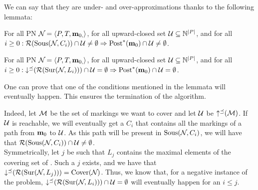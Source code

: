 We can say that they are under- and over-approximations thanks to the following lemmata:
\begin{lemm}
  For all \ac{PN} $\mathcal{N}_{} = \left\langle P_{}, T_{}, \mathbf{m}_{0,}\right\rangle$, for all upward-closed set $\mathcal{U} \subseteq \mathbb{N}^{\left|P\right|}$, and for all $i \geq 0: \operatorname{\mathcal{R}}(\operatorname{Sous}(\mathcal{N}_{},C_i)) \cap \mathcal{U} \neq \emptyset \Rightarrow \operatorname{Post}^*_{}(\mathbf{m}_0) \cap \mathcal{U} \neq \emptyset$.
\end{lemm}
\begin{lemm}
  For all \ac{PN} $\mathcal{N}_{} = \left\langle P_{}, T_{}, \mathbf{m}_{0,}\right\rangle$, for all upward-closed set $\mathcal{U} \subseteq \mathbb{N}^{\left|P\right|}$, and for all $i \geq 0: \operatorname{\downarrow^\preceq}(\operatorname{\mathcal{R}}(\operatorname{Sur}(\mathcal{N}_{},L_i))) \cap \mathcal{U} = \emptyset \Rightarrow \operatorname{Post}^*_{}(\mathbf{m}_0) \cap \mathcal{U} = \emptyset$.
\end{lemm}

One can prove that one of the conditions mentioned in the lemmata will eventually happen.
This ensures the termination of the algorithm.

Indeed, let $\mathcal{M}$ be the set of markings we want to cover and let $\mathcal{U}$ be $\operatorname{\uparrow^\preceq}(\mathcal{M})$.
If $\mathcal{U}$ is reachable, we will eventually get a $C_i$ that contains all the markings of a path from $\mathbf{m}_0$ to $\mathcal{U}$.
As this path will be present in $\operatorname{Sous}(\mathcal{N}_{}, C_i)$, we will have that $\operatorname{\mathcal{R}}(\operatorname{Sous}(\mathcal{N}_{},C_i)) \cap \mathcal{U} \neq \emptyset$.\\
Symmetrically, let $j$ be such that $L_j$ contains the maximal elements of the covering set of \namePN.
Such a $j$ exists, and we have that $\operatorname{\downarrow^\preceq}(\operatorname{\mathcal{R}}(\operatorname{Sur}(\mathcal{N}_{},L_j))) = \operatorname{Cover}(\mathcal{N}_{})$.
Thus, we know that, for a negative instance of the problem, $\operatorname{\downarrow^\preceq}(\operatorname{\mathcal{R}}(\operatorname{Sur}(\mathcal{N}_{},L_i))) \cap \mathcal{U} = \emptyset$ will eventually happen for an $i \leq j$.


